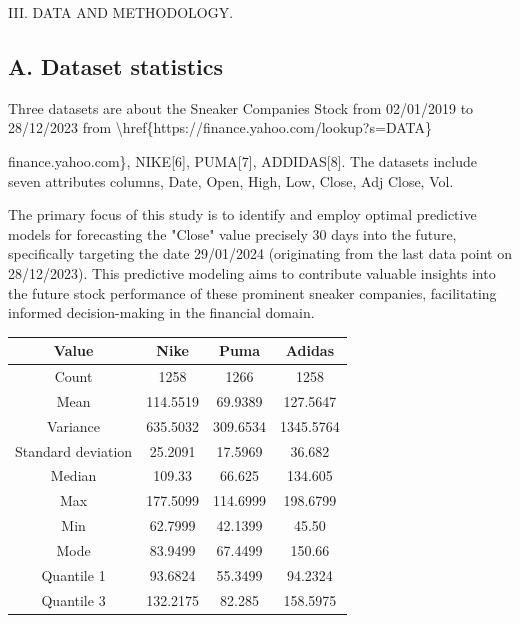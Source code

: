 \documentclass[conference]{IEEEtran}
\begin{document}
III. DATA AND METHODOLOGY.

\subsection*{A. Dataset statistics}
Three datasets are about the Sneaker Companies Stock from 02/01/2019 to 28/12/2023 from \textbackslash{}href\{https://finance.yahoo.com/lookup?s=DATA\}{finance.yahoo.com\}, NIKE[6], PUMA[7], ADDIDAS[8]. The datasets include seven attributes columns, Date, Open, High, Low, Close, Adj Close, Vol. 

The primary focus of this study is to identify and employ optimal predictive models for forecasting the "Close" value precisely 30 days into the future, specifically targeting the date 29/01/2024 (originating from the last data point on 28/12/2023). This predictive modeling aims to contribute valuable insights into the future stock performance of these prominent sneaker companies, facilitating informed decision-making in the financial domain.
\begin{table}[htbp]
\centering
\begin{tabular}{|c|c|c|c|} \hline 

 Value& Nike & Puma& Adidas\\ \hline 

 Count& 1258 & 1266& 1258\\ \hline 

 Mean& 114.5519& 69.9389& 127.5647\\ \hline 

 Variance& 635.5032& 309.6534& 1345.5764\\ \hline 

 Standard deviation& 25.2091& 17.5969& 36.682\\ \hline 

 Median & 109.33 & 66.625& 134.605\\ \hline 

 Max& 177.5099& 114.6999& 198.6799\\ \hline 

 Min& 62.7999& 42.1399& 45.50 \\ \hline 

 Mode & 83.9499& 67.4499& 150.66 \\ \hline 

 Quantile 1 & 93.6824& 55.3499& 94.2324\\ \hline 

 Quantile 3 & 132.2175& 82.285& 158.5975\\ \hline 


\end{tabular}
\end{table}}
\end{document}
